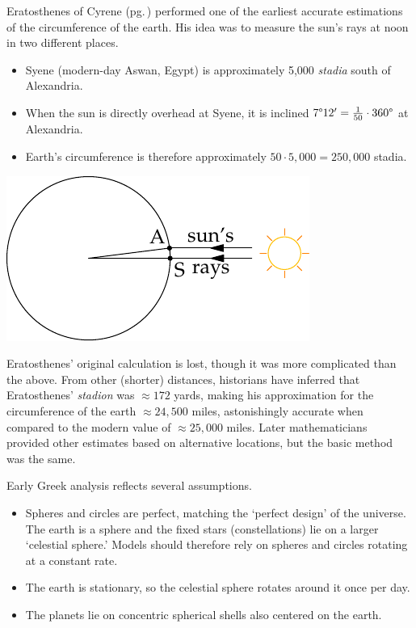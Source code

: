 Eratosthenes of Cyrene (pg.\,\pageref{pg:eratosthenes}) performed one of the earliest accurate estimations of the circumference of the earth. His idea was to measure the sun's rays at noon in two different places.\par
\begin{minipage}[t]{0.6\linewidth}\vspace{-5pt}
	\begin{itemize}\itemsep0pt
	  \item Syene (modern-day Aswan, Egypt) is approximately 5,000 \emph{stadia} south of Alexandria.
		\item When the sun is directly overhead at Syene, it is inclined $\ang 712'=\frac 1{50}\cdot \ang{360}$ at Alexandria.
		\item Earth's circumference is therefore approximately $50\cdot 5,000=250,000$ stadia.
	\end{itemize}
\end{minipage}\hfill\begin{minipage}[t]{0.39\linewidth}\vspace{-5pt}
	\flushright\includegraphics[scale=0.95]{geo-18-circearth}
\end{minipage}
\bigbreak

Eratosthenes' original calculation is lost, though it was more complicated than the above. From other (shorter) distances, historians have inferred that Eratosthenes' \emph{stadion} was $\approx 172$ yards, making his approximation for the circumference of the earth $\approx 24,500$ miles, astonishingly accurate when compared to the modern value of $\approx 25,000$ miles. Later mathematicians provided other estimates based on alternative locations, but the basic method was the same.


Early Greek analysis reflects several assumptions.
\begin{itemize}
  \item Spheres and circles are perfect, matching the `perfect design' of the universe. The earth is a sphere and the fixed stars (constellations) lie on a larger `celestial sphere.' Models should therefore rely on spheres and circles rotating at a constant rate.
  \item The earth is stationary, so the celestial sphere rotates around it once per day.
  \item The planets lie on concentric spherical shells also centered on the earth.
\end{itemize}

